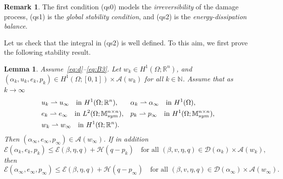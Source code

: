 \documentclass[reqno]{amsart}
\newtheorem{lemma}[corollary]{Lemma}
\theoremstyle{definition}
\newtheorem{remark}[corollary]{Remark}
\numberwithin{equation}{section}
\def\R {\mathbb R}
\def\N {\mathbb N}
\def\M {\mathbb M^{n\times n}_{\rm sym}}
\begin{document}
\begin{remark}
The first condition (qs0) models the {\it irreversibility} of the damage process, (qs1) is the {\it global stability condition}, and (qs2) is the {\it energy-dissipation balance}.
\end{remark}

Let us check that the integral in (qs2) is well defined. To this aim, we first prove the following stability result.

\begin{lemma}\label{lem:stab}
Assume~\eqref{eq:d}--\eqref{eq:B3}. Let $w_k\in H^1(\Omega;\R^n)$, and $(\alpha_k,u_k,e_k,p_k)\in H^1(\Omega;[0,1])\times\mathcal A(w_k)$ for all $k\in\N$. Assume that as $k\to\infty$
\begin{align*}
   &u_k\rightharpoonup u_\infty\quad\text{in $H^1(\Omega;\R^n)$}, & &\alpha_k\rightharpoonup \alpha_\infty\quad\text{in $H^1(\Omega)$},\\
   &e_k\rightharpoonup e_\infty\quad\text{in $L^2(\Omega;\M)$}, & &p_k\rightharpoonup p_\infty\quad\text{in $H^1(\Omega;\M)$},\\
   &w_k\rightharpoonup w_\infty\quad\text{in $H^1(\Omega;\R^n)$}. & &
\end{align*}
Then $(\alpha_\infty,e_\infty,p_\infty)\in\mathcal A(w_\infty)$. If in addition
\begin{equation}\label{eq:gl_kst}
\mathcal E(\alpha_k,e_k,p_k)\le \mathcal E(\beta,\eta,q)+\mathcal H(q-p_k) \quad\text{for all $(\beta,v,\eta,q)\in\mathcal D(\alpha_k)\times \mathcal A(w_k)$},
\end{equation}
then
\begin{equation}\label{eq:gl_infst}
\mathcal E(\alpha_\infty,e_\infty,p_\infty)\le \mathcal E(\beta,\eta,q)+\mathcal H(q-p_\infty) \quad\text{for all $(\beta,v,\eta,q)\in\mathcal D(\alpha_\infty)\times \mathcal A(w_\infty)$}.
\end{equation}
\end{lemma}
\end{document}
